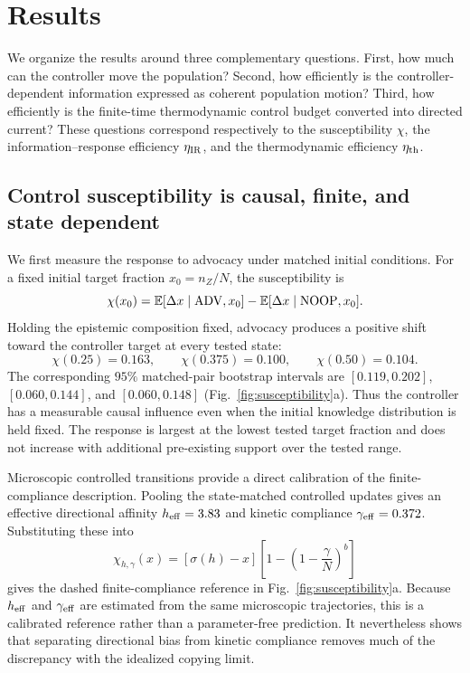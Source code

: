 \section{Results}
\label{sec:results}

We organize the results around three complementary questions. First, how much
can the controller move the population? Second, how efficiently is the
controller-dependent information expressed as coherent population motion?
Third, how efficiently is the finite-time thermodynamic control budget converted
into directed current? These questions correspond respectively to the
susceptibility $\chi$, the information--response efficiency $\eta_{\rm IR}$,
and the thermodynamic efficiency $\eta_{\rm th}$.

\subsection{Control susceptibility is causal, finite, and state dependent}

We first measure the response to advocacy under matched initial conditions.
For a fixed initial target fraction $x_0=n_Z/N$, the susceptibility is
\[
\chi(x_0)=\mathbb E[\Delta x\mid {\rm ADV},x_0]
          -\mathbb E[\Delta x\mid {\rm NOOP},x_0].
\]
Holding the epistemic composition fixed, advocacy produces a positive shift
toward the controller target at every tested state:
\[
\chi(0.25)=0.163,\qquad
\chi(0.375)=0.100,\qquad
\chi(0.50)=0.104.
\]
The corresponding $95\%$ matched-pair bootstrap intervals are
$[0.119,0.202]$, $[0.060,0.144]$, and $[0.060,0.148]$
(Fig.~\ref{fig:susceptibility}a). Thus the controller has a measurable causal
influence even when the initial knowledge distribution is held fixed. The
response is largest at the lowest tested target fraction and does not increase
with additional pre-existing support over the tested range.

Microscopic controlled transitions provide a direct calibration of the
finite-compliance description. Pooling the state-matched controlled updates
gives an effective directional affinity $h_{\rm eff}=3.83$ and kinetic
compliance $\gamma_{\rm eff}=0.372$. Substituting these into
\[
\chi_{h,\gamma}(x)=
[\sigma(h)-x]\left[1-\left(1-\frac{\gamma}{N}\right)^b\right]
\]
gives the dashed finite-compliance reference in
Fig.~\ref{fig:susceptibility}a. Because $h_{\rm eff}$ and $\gamma_{\rm eff}$ are estimated from the same microscopic trajectories, this is a calibrated reference rather than a parameter-free prediction. It nevertheless shows that separating directional bias from kinetic compliance removes much of the discrepancy with the idealized copying limit.

